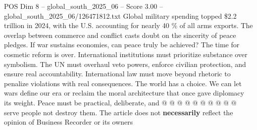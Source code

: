 \begin{textsample}{POS Dim 8 – global\_south\_2025\_06 – Score 3.00 – global\_south\_2025\_06/126471812.txt}
Global military spending topped \$2.2 trillion in 2024, with the U.S. accounting for nearly 40 \% of all arms exports.
The overlap between commerce and conflict casts doubt on the sincerity of peace pledges.
If war sustains economies, can peace truly be achieved?
The time for cosmetic reform is over.
International institutions must prioritize substance over symbolism.
The UN must overhaul veto powers, enforce civilian protection, and ensure real accountability.
International law must move beyond rhetoric to penalize violations with real consequences.
The world has a choice.
We can let wars define our era or reclaim the moral architecture that once gave diplomacy its weight.
Peace must be practical, deliberate, and @ @ @ @ @ @ @ @ @ @ serve people not destroy them.
The article does not \textbf{necessarily} reflect the opinion of Business Recorder or its owners

\end{textsample}
